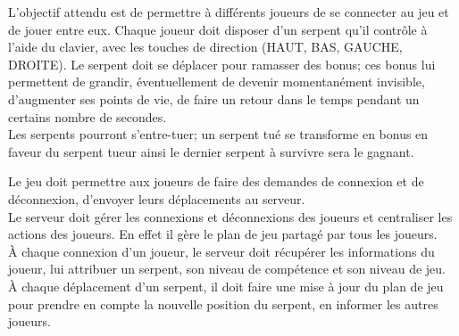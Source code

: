 \par
L'objectif attendu est de permettre à différents joueurs de se connecter au jeu et de jouer entre eux.
Chaque joueur doit disposer d'un serpent qu'il contrôle à l'aide du clavier, avec les touches de direction (HAUT, BAS, GAUCHE, DROITE). Le serpent doit se déplacer pour ramasser des bonus; ces bonus lui permettent de grandir, éventuellement de devenir momentanément invisible, d'augmenter ses points de vie, de faire un retour dans le temps pendant un certains nombre de secondes.\\
Les serpents pourront s'entre-tuer; un serpent tué se transforme en bonus en faveur du serpent tueur ainsi le dernier serpent à survivre sera le gagnant.

\par
Le jeu doit permettre aux joueurs de faire des demandes de connexion et de déconnexion, d'envoyer leurs déplacements au serveur.\\
Le serveur doit gérer les connexions et déconnexions des joueurs et centraliser les actions des joueurs. En effet il gère le plan de jeu partagé par tous les joueurs.\\
À chaque connexion d'un joueur, le serveur doit récupérer les informations du joueur, lui attribuer un serpent, son niveau de compétence et son niveau de jeu.\\
À chaque déplacement d'un serpent, il doit faire une mise à jour du plan de jeu pour prendre en compte la nouvelle position du serpent, en informer les autres joueurs.